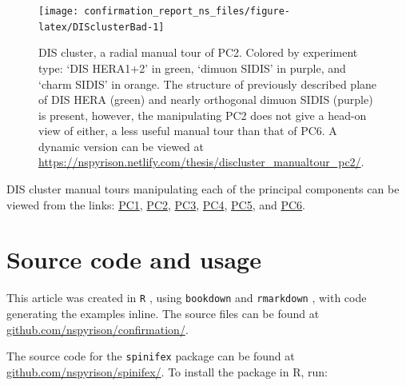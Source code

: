 \documentclass{monashthesis}
\begin{document}
\begin{figure}

{\centering \texttt{[image: confirmation\_report\_ns\_files/figure-latex/DISclusterBad-1]} 

}

\caption{DIS cluster, a radial manual tour of PC2.
Colored by experiment type: `DIS HERA1+2' in green, `dimuon SIDIS' in
purple, and `charm SIDIS' in orange. The structure of previously
described plane of DIS HERA (green) and nearly orthogonal dimuon SIDIS
(purple) is present, however, the manipulating PC2 does not give a
head-on view of either, a less useful manual tour than that of PC6. A
dynamic version can be viewed at
\url{https://nspyrison.netlify.com/thesis/discluster_manualtour_pc2/}.}\label{fig:DISclusterBad}
\end{figure}

DIS cluster manual tours manipulating each of the principal components
can be viewed from the links:
\href{https://nspyrison.netlify.com/thesis/discluster_manualtour_pc1/}{PC1},
\href{https://nspyrison.netlify.com/thesis/discluster_manualtour_pc2/}{PC2},
\href{https://nspyrison.netlify.com/thesis/discluster_manualtour_pc3/}{PC3},
\href{https://nspyrison.netlify.com/thesis/discluster_manualtour_pc4/}{PC4},
\href{https://nspyrison.netlify.com/thesis/discluster_manualtour_pc5/}{PC5},
and
\href{https://nspyrison.netlify.com/thesis/discluster_manualtour_pc6/}{PC6}.

\section{Source code and usage}\label{source-code-and-usage}

This article was created in \texttt{R} \autocite{r_core_team_r:_2018},
using \texttt{bookdown} \autocite{xie_bookdown:_2016} and
\texttt{rmarkdown} \autocite{xie_r_2018}, with code generating the
examples inline. The source files can be found at
\href{https://github.com/nspyrison/confirmation/}{github.com/nspyrison/confirmation/}.

The source code for the \texttt{spinifex} package can be found at
\href{https://github.com/nspyrison/spinifex/}{github.com/nspyrison/spinifex/}.
To install the package in R, run:

\begin{Shaded}
\begin{Highlighting}[]
\OperatorTok{::}\NormalTok{(}\NormalTok{)}
\end{Highlighting}
\end{Shaded}
\end{document}
